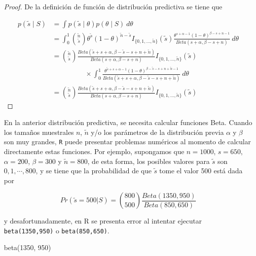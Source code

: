\documentclass[
  10pt,
  spanish,
]{book}
\newenvironment{Shaded}{\begin{snugshade}}{\end{snugshade}}
\newcommand{\DecValTok}[1]{\textcolor[rgb]{0.00,0.00,0.81}{#1}}
\newcommand{\FunctionTok}[1]{\textcolor[rgb]{0.00,0.00,0.00}{#1}}
\newcommand{\NormalTok}[1]{#1}
\theoremstyle{definition}
\theoremstyle{definition}
\theoremstyle{definition}
\theoremstyle{definition}
\theoremstyle{remark}
\begin{document}
\begin{proof}
{}De la definición de función de distribución predictiva se tiene que

\begin{align*}
p(\tilde{s} \mid S)&=\int p(\tilde{s} \mid \theta)p(\theta \mid S)\ d\theta\\
&=\int_0^1 \binom{\tilde{n}}{\tilde{s}} \theta^{\tilde{s}}(1-\theta)^{\tilde{n}-\tilde{s}}I_{\{0,1,\ldots,\tilde{n}\}}(\tilde{s})
\frac{\theta^{s+\alpha-1}(1-\theta)^{\beta-s+n-1}}{Beta(s+\alpha,\beta-s+n)}\ d\theta\\
&=\binom{\tilde{n}}{\tilde{s}}\frac{Beta(\tilde{s}+s+\alpha,\beta-\tilde{s}-s+n+\tilde{n})}{Beta(s+\alpha,\beta-s+n)}I_{\{0,1,\ldots,\tilde{n}\}}(\tilde{s})\\
& \hspace{2cm}\times
\int_0^1\frac{\theta^{\tilde{s}+s+\alpha-1}(1-\theta)^{\beta-\tilde{s}-s+n+\tilde{n}-1}}
{Beta(\tilde{s}+s+\alpha,\beta-\tilde{s}-s+n+\tilde{n})}\ d\theta\\
&=\binom{\tilde{n}}{\tilde{s}}\frac{Beta(\tilde{s}+s+\alpha,\beta-\tilde{s}-s+n+\tilde{n})}{Beta(s+\alpha,\beta-s+n)}I_{\{0,1,\ldots,\tilde{n}\}}(\tilde{s})
\end{align*}
\end{proof}

En la anterior distribución predictiva, se necesita calcular funciones
Beta. Cuando los tamaños muestrales \(n\), \(\tilde{n}\) y/o los
parámetros de la distribución previa \(\alpha\) y \(\beta\) son muy grandes,
\texttt{R} puede presentar problemas numéricos al momento de calcular directamente estas funciones. Por ejemplo, supongamos que \(n=1000\), \(s=650\), \(\alpha=200\), \(\beta=300\) y \(\tilde{n}=800\), de esta forma, los posibles
valores para \(\tilde{s}\) son \(0,1,\cdots,800\), y se tiene que la
probabilidad de que \(\tilde{s}\) tome el valor 500 está dada por

\begin{equation}
\label{eq:Ejebinom}
Pr(\tilde{s}=500|S)=
\binom{800}{500}\frac{Beta(1350,950)}{Beta(850,650)}
\end{equation}

y desafortunadamente, en \textsf{R} se presenta error al intentar
ejecutar \texttt{beta(1350,950)} o \texttt{beta(850,650)}.

\begin{Shaded}
\begin{Highlighting}[]
\FunctionTok{beta}\NormalTok{(}\DecValTok{1350}\NormalTok{, }\DecValTok{950}\NormalTok{)}
\end{Highlighting}
\end{Shaded}
\end{document}
